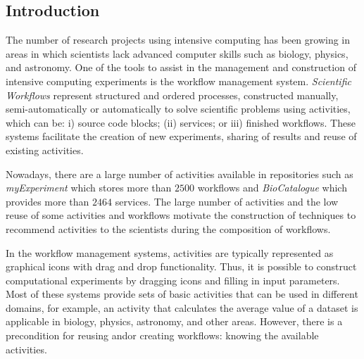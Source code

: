 \documentclass[a0, portrait]{a0poster}
\begin{document}
\begin{multicols}{2} %



\section*{Introduction}

The number of research projects using intensive computing has been growing in areas in which scientists lack advanced computer skills such as biology, physics, and astronomy. One of the tools to assist in the management and construction of intensive computing experiments is the workflow management system. \emph{Scientific Workflows} represent structured and ordered processes, constructed manually, semi-automatically or automatically to solve scientific problems using activities, which can be: i) source code blocks; (ii) services; or iii) finished workflows. These systems facilitate the creation of new experiments, sharing of results and reuse of existing activities.

Nowadays, there are a large number of activities available in repositories such as \emph{myExperiment} which stores more than $2500$ workflows and \emph{BioCatalogue} which provides more than $2464$ services. The large number of activities and the low reuse of some activities and workflows motivate the construction of techniques to recommend activities to the scientists during the composition of workflows.

In the workflow management systems, activities are typically represented as graphical icons with drag and drop functionality. Thus, it is possible to construct computational experiments by dragging icons and filling in input parameters. Most of these systems provide sets of basic activities that can be used in different domains, for example, an activity that calculates the average value of a dataset is applicable in biology, physics, astronomy, and other areas. However, there is a precondition for reusing and\/or creating workflows: knowing the available activities.


\end{multicols}
\end{document}
